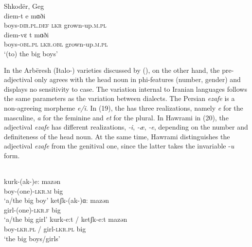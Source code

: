 \documentclass[output=paper]{langsci/langscibook}
\begin{document}
\ea%
    Shkodër, Geg \label{ex:manzini:18}\\
    \ea
    \gll diem-t     e   mɑði     \\
         boys-\textsc{dir.pl.def}  \textsc{lkr}  grown-up.\textsc{m.pl}  \\
    \ex
    \gll diem-vɛ    t     mɑði \\
         boys-\textsc{obl.pl}     \textsc{lkr.obl}  grown-up.\textsc{m.pl}\\
    \glt ‘(to) the big boys’  
    \z
\z

In the Arbëresh (Italo-) varieties discussed by \citeauthor{Manzini2011Grammatical}\linebreak (\citeyear{Manzini2011Grammatical}), on the other hand, the pre-ad\-jec\-ti\-val  only agrees with the head noun in phi-features (number, gender) and displays no sensitivity to case. The variation internal to Iranian languages follows the same parameters as the variation between  dialects. The Persian \textit{ezafe} is a non-agreeing morpheme \textit{e\slash i}. In   (19), the  has three realizations, namely \textit{e} for the masculine, \textit{a} for the feminine and \textit{et} for the plural. In Hawrami  in (20), the adjectival \textit{ezafe} has different realizations, \textit{{}-i}, \textit{{}-æ}, \textit{{}-e}, depending on the number and definiteness of the head noun. At the same time, Hawrami  distinguishes the adjectival \textit{ezafe} from the genitival one, since the latter takes the invariable -\textit{u} form.

\ea%
      \citep{Franco2015}\label{ex:manzini:19}\\
    \ea
    \gll kurk-(ak-)e:     mazən       \\
         boy-(one)-\textsc{lkr.m}    big     \\
    \glt ‘a/the big boy’
    \ex
    \gll ketʃk-(ak-)ɑ:    mazən      \\
         girl-(one)-\textsc{lkr.f}   big     \\
    \glt ‘a/the big girl’
    \ex
    \gll kurk-e:t / ketʃk-e:t     mazən     \\
         boy-\textsc{lkr.pl} / girl-\textsc{lkr.pl}  big   \\
    \glt ‘the big boys/girls’
    \z
\z
\end{document}
